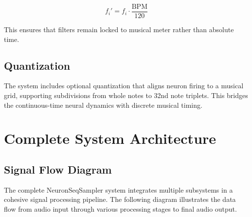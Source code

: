 \documentclass[11pt,a4paper]{article}
\begin{document}
\begin{equation}
f_i' = f_i \cdot \frac{\text{BPM}}{120}
\end{equation}

This ensures that filters remain locked to musical meter rather than absolute time.

\subsection{Quantization}

The system includes optional quantization that aligns neuron firing to a musical grid, supporting subdivisions from whole notes to 32nd note triplets. This bridges the continuous-time neural dynamics with discrete musical timing.

\section{Complete System Architecture}

\subsection{Signal Flow Diagram}

The complete NeuronSeqSampler system integrates multiple subsystems in a cohesive signal processing pipeline. The following diagram illustrates the data flow from audio input through various processing stages to final audio output.
\end{document}
